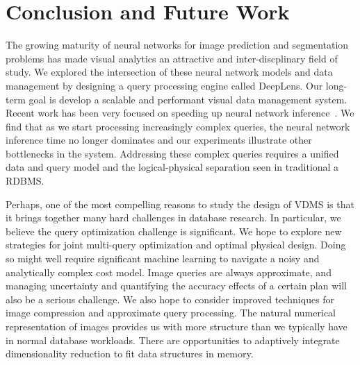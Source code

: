 \section{Conclusion and Future Work}
The growing maturity of neural networks for image prediction and segmentation problems has made visual analytics an attractive and inter-discplinary field of study.
We explored the intersection of these neural network models and data management by designing a query processing engine called \textsf{DeepLens}.
Our long-term goal is develop a scalable and performant visual data management system.
Recent work has been very focused on speeding up neural network inference~\cite{kang2017noscope, zhang2018ffs, anderson2018physical, jiang2018chameleon}.
We find that as we start processing increasingly complex queries, the neural network inference time no longer dominates and our experiments illustrate other bottlenecks in the system.
Addressing these complex queries requires a unified data and query model and the logical-physical separation seen in traditional a RDBMS.

Perhaps, one of the most compelling reasons to study the design of VDMS is that it brings together many hard challenges in database research. 
In particular, we believe the query optimization challenge is significant.
We hope to explore new strategies for joint multi-query optimization and optimal physical design. Doing so might well require significant machine learning to navigate a noisy and analytically complex cost model. 
Image queries are always approximate, and managing uncertainty and quantifying the accuracy effects of a certain plan will also be a serious challenge.
We also hope to consider improved techniques for image compression and approximate query processing.
The natural numerical representation of images provides us with more structure than we typically have in normal database workloads.
There are opportunities to adaptively integrate dimensionality reduction to fit data structures in memory.

